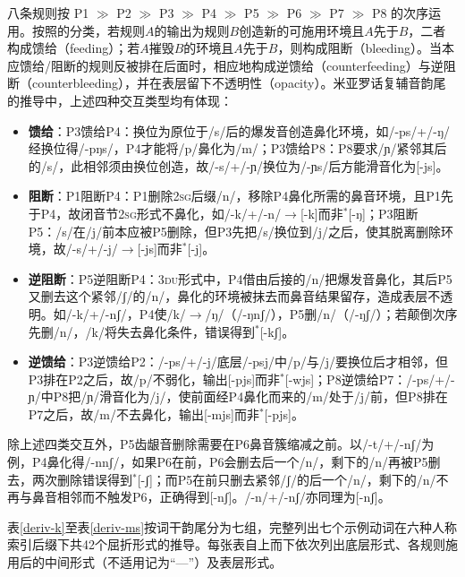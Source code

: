 八条规则按 P1 $\gg$ P2 $\gg$ P3 $\gg$ P4 $\gg$ P5 $\gg$ P6 $\gg$ P7 $\gg$ P8 的次序运用。按照\textcite{Kiparsky1968-fb}的分类，若规则$A$的输出为规则$B$创造新的可施用环境且$A$先于$B$，二者构成馈给（feeding）；若$A$摧毁$B$的环境且$A$先于$B$，则构成阻断（bleeding）。当本应馈给/阻断的规则反被排在后面时，相应地构成逆馈给（counterfeeding）与逆阻断（counterbleeding），并在表层留下不透明性（opacity）\parencite{Kiparsky1973-op,mccarthy2007hidden}。米亚罗话复辅音韵尾的推导中，上述四种交互类型均有体现：

\begin{itemize}
    \item \textbf{馈给}：P3馈给P4：换位为原位于/s/后的爆发音创造鼻化环境，如/-ps/+/-ŋ/经换位得/-pŋs/，P4才能将/p/鼻化为/m/；P3馈给P8：P8要求/ɲ/紧邻其后的/s/，此相邻须由换位创造，故/-s/+/-ɲ/换位为/-ɲs/后方能滑音化为[-js]。
    \item \textbf{阻断}：P1阻断P4：P1删除2\textsc{sg}后缀/n/，移除P4鼻化所需的鼻音环境，且P1先于P4，故闭音节2\textsc{sg}形式不鼻化，如/-k/+/-n/$\rightarrow$[-k]而非$^*$[-ŋ]；P3阻断P5：/s/在/j/前本应被P5删除，但P3先把/s/换位到/j/之后，使其脱离删除环境，故/-s/+/-j/$\rightarrow$[-js]而非$^*$[-j]。
    \item \textbf{逆阻断}：P5逆阻断P4：3\textsc{du}形式中，P4借由后接的/n/把爆发音鼻化，其后P5又删去这个紧邻/ʃ/的/n/，鼻化的环境被抹去而鼻音结果留存，造成表层不透明。如/-k/+/-nʃ/，P4使/k/$\rightarrow$/ŋ/（/-ŋnʃ/），P5删/n/（/-ŋʃ/）；若颠倒次序先删/n/，/k/将失去鼻化条件，错误得到$^*$[-kʃ]。
    \item \textbf{逆馈给}：P3逆馈给P2：/-ps/+/-j/底层/-psj/中/p/与/j/要换位后才相邻，但P3排在P2之后，故/p/不弱化，输出[-pjs]而非$^*$[-wjs]；P8逆馈给P7：/-ps/+/-ɲ/中P8把/ɲ/滑音化为/j/，使前面经P4鼻化而来的/m/处于/j/前，但P8排在P7之后，故/m/不去鼻化，输出[-mjs]而非$^*$[-pjs]。
\end{itemize}

除上述四类交互外，P5齿龈音删除需要在P6鼻音簇缩减之前。以/-t/+/-nʃ/为例，P4鼻化得/-nnʃ/，如果P6在前，P6会删去后一个/n/，剩下的/n/再被P5删去，两次删除错误得到$^*$[-ʃ]；而P5在前只删去紧邻/ʃ/的后一个/n/，剩下的/n/不再与鼻音相邻而不触发P6，正确得到[-nʃ]。/-n/+/-nʃ/亦同理为[-nʃ]。

表\ref{deriv-k}至表\ref{deriv-ms}按词干韵尾分为七组，完整列出七个示例动词在六种人称索引后缀下共42个屈折形式的推导。每张表自上而下依次列出底层形式、各规则施用后的中间形式（不适用记为“---”）及表层形式。

